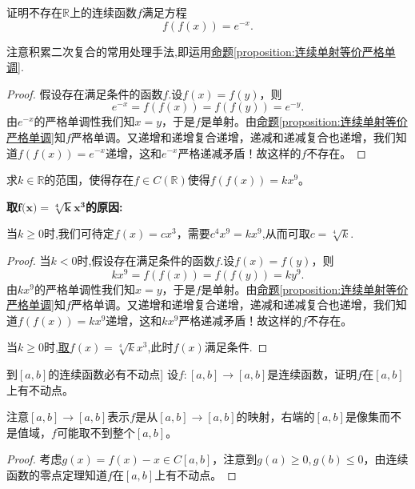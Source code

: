 \documentclass[../../main.tex]{subfiles}
\begin{document}
\begin{example}
证明不存在\(\mathbb{R}\)上的连续函数\(f\)满足方程
\[
f(f(x)) = e^{-x}.
\]
\end{example}
\begin{note}
注意积累二次复合的常用处理手法,即运用\hyperref[proposition:连续单射等价严格单调]{命题\ref{proposition:连续单射等价严格单调}}.
\end{note}
\begin{proof}
假设存在满足条件的函数$f$.设\(f(x)=f(y)\)，则
\[
e^{-x}=f(f(x)) = f(f(y)) = e^{-y}.
\]
由\(e^{-x}\)的严格单调性我们知\(x = y\)，于是\(f\)是单射。由\hyperref[proposition:连续单射等价严格单调]{命题\ref{proposition:连续单射等价严格单调}}知\(f\)严格单调。又递增和递增复合递增，递减和递减复合也递增，我们知道\(f(f(x)) = e^{-x}\)递增，这和\(e^{-x}\)严格递减矛盾！故这样的\(f\)不存在。
\end{proof}

\begin{example}
求\(k\in\mathbb{R}\)的范围，使得存在\(f\in C(\mathbb{R})\)使得\(f(f(x)) = kx^{9}\)。
\end{example}
\begin{note}
\hypertarget{取这个函数的原因}{\textbf{取$\boldsymbol{f}\mathbf{(}\boldsymbol{x}\mathbf{)}=\sqrt[\mathbf{4}]{\boldsymbol{k}}\boldsymbol{x}^{\mathbf{3}}$的原因:}}当\(k\geqslant0\)时,我们可待定\(f(x)=cx^{3}\)，需要\(c^{4}x^{9}=kx^{9}\),从而可取\(c = \sqrt[4]{k}\).
\end{note}
\begin{proof}
当$k<0$时,假设存在满足条件的函数$f$.设\(f(x)=f(y)\)，则
\[
kx^{9}=f(f(x)) = f(f(y)) = ky^{9}.
\]
由\(kx^{9}\)的严格单调性我们知\(x = y\)，于是\(f\)是单射。由\hyperref[proposition:连续单射等价严格单调]{命题\ref{proposition:连续单射等价严格单调}}知\(f\)严格单调。又递增和递增复合递增，递减和递减复合也递增，我们知道\(f(f(x)) = kx^{9}\)递增，这和\(kx^{9}\)严格递减矛盾！故这样的\(f\)不存在。

当\(k\geqslant0\)时,\hyperlink{取这个函数的原因}{取$f(x)=\sqrt[4]{k}x^3$},此时$f(x)$满足条件.
\end{proof}

\begin{proposition}[\([a,b]\)到\([a,b]\)的连续函数必有不动点]\label{proposition:[a,b]到[a,b]的连续函数必有不动点}
设\(f:[a,b]\to[a,b]\)是连续函数，证明\(f\)在\([a,b]\)上有不动点。
\end{proposition}
\begin{note}
注意\([a,b]\to[a,b]\)表示\(f\)是从\([a,b]\to[a,b]\)的映射，右端的\([a,b]\)是像集而不是值域，\(f\)可能取不到整个\([a,b]\)。
\end{note}
\begin{proof}
考虑\(g(x)=f(x)-x\in C[a,b]\)，注意到\(g(a)\geqslant0,g(b)\leqslant0\)，由连续函数的零点定理知道\(f\)在\([a,b]\)上有不动点。
\end{proof}
\end{document}
